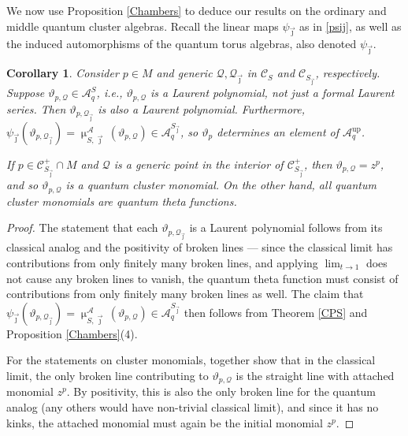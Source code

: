 \documentclass{amsart}
\DeclareMathOperator{\up}{up}
\let\rar=\rightarrow
\let\s=\mathcal
\newcommand {\sQ} {\mathcal{Q}}
\newcommand {\jj} {\vec{\jmath}}
\renewcommand{\mu}{\upmu}
\theoremstyle{plain}%
\newtheorem{cor}[thm]{Corollary}
\theoremstyle{definition}
\theoremstyle{remark}
\begin{document}
We now use Proposition \ref{Chambers} to deduce our results on the ordinary and middle quantum cluster algebras.  Recall the linear maps $\psi_{\jj}$ as in \eqref{psij}, as well as the induced automorphisms of the quantum torus algebras, also denoted $\psi_{\jj}$.


\begin{cor}\label{UpTheta}
Consider $p\in M$ and generic $\sQ,\sQ_{\jj}$ in $\s{C}_S$ and $\s{C}_{S_{\jj}}$, respectively.  Suppose $\vartheta_{p,\sQ}\in \s{A}_q^S$, i.e., $\vartheta_{p,\sQ}$ is a Laurent polynomial, not just a formal Laurent series.  Then $\vartheta_{p,\sQ_{\jj}}$ is also a Laurent polynomial.  Furthermore, $\psi_{\jj}(\vartheta_{p,\sQ_{\jj}})= \mu^{\s{A}}_{S,\jj}(\vartheta_{p,\sQ})\in \s{A}_q^{S_{\jj}}$, so $\vartheta_{p}$ determines an element of $\s{A}_q^{\up}$.


If $p\in \s{C}_{S_{\jj}}^+\cap M$ and $\sQ$ is a generic point in the interior of $\s{C}_{S_{\jj}}^+$, then $\vartheta_{p,\sQ}=z^p$, and so $\vartheta_{p,\sQ}$ is a quantum cluster monomial.  On the other hand, all quantum cluster monomials are quantum theta functions.
\end{cor}
\begin{proof}
The statement that each $\vartheta_{p,\sQ_{\jj}}$ is a Laurent polynomial follows from its classical analog \cite[Prop. 7.1]{GHKK} and the positivity of broken lines --- since the classical limit has contributions from only finitely many broken lines, and applying $\lim_{t\rar 1}$ does not cause any broken lines to vanish, the quantum theta function must consist of contributions from only finitely many broken lines as well.  The claim that $\psi_{\jj}(\vartheta_{p,\sQ_{\jj}}) = \mu^{\s{A}}_{S,\jj}(\vartheta_{p,\sQ})\in \s{A}_q^{S_{\jj}}$ then follows from Theorem \ref{CPS} and Proposition \ref{Chambers}(4).



For the statements on cluster monomials, \cite[Prop. 3.6 and 3.8]{GHKK} together show that in the classical limit, the only broken line contributing to $\vartheta_{p,\sQ}$ is the straight line with attached monomial $z^p$.  By positivity, this is also the only broken line for the quantum analog (any others would have non-trivial classical limit), and since it has no kinks, the attached monomial must again be the initial monomial $z^p$.
\end{proof}
\end{document}
